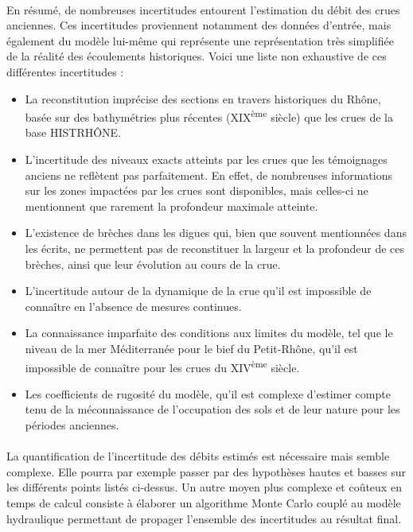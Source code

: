 	\paragraph{} En résumé, de nombreuses incertitudes entourent l'estimation du débit des crues anciennes. Ces incertitudes proviennent notamment des données d'entrée, mais également du modèle lui-même qui représente une représentation très simplifiée de la réalité des écoulements historiques. Voici une liste non exhaustive de ces différentes incertitudes :
	
	\begin{itemize}
		\item La reconstitution imprécise des sections en travers historiques du Rhône, basée sur des bathymétries plus récentes (XIX\textsuperscript{ème} siècle) que les crues de la base HISTRHÔNE.
		\item L'incertitude des niveaux exacts atteints par les crues que les témoignages anciens ne reflètent pas parfaitement. En effet, de nombreuses informations sur les zones impactées par les crues sont disponibles, mais celles-ci ne mentionnent que rarement la profondeur maximale atteinte.
		\item  L'existence de brèches dans les digues qui, bien que souvent mentionnées dans les écrits, ne permettent pas de reconstituer la largeur et la profondeur de ces brèches, ainsi que leur évolution au cours de la crue.
		\item L'incertitude autour de la dynamique de la crue qu'il est impossible de connaître en l'absence de mesures continues.
		\item La connaissance imparfaite des conditions aux limites du modèle, tel que le niveau de la mer Méditerranée pour le bief du Petit-Rhône, qu'il est impossible de connaître pour les crues du XIV\textsuperscript{ème} siècle.
		\item Les coefficients de rugosité du modèle, qu'il est complexe d'estimer compte tenu de la méconnaissance de l'occupation des sols et de leur nature pour les périodes anciennes.	
	\end{itemize}
		
	\paragraph{} La quantification de l'incertitude des débits estimés est nécessaire mais semble complexe. Elle pourra par exemple passer par des hypothèses hautes et basses sur les différents points listés ci-dessus. Un autre moyen plus complexe et coûteux en temps de calcul consiste à élaborer un algorithme Monte Carlo couplé au modèle hydraulique permettant de propager l'ensemble des incertitudes au résultat final.	
	

